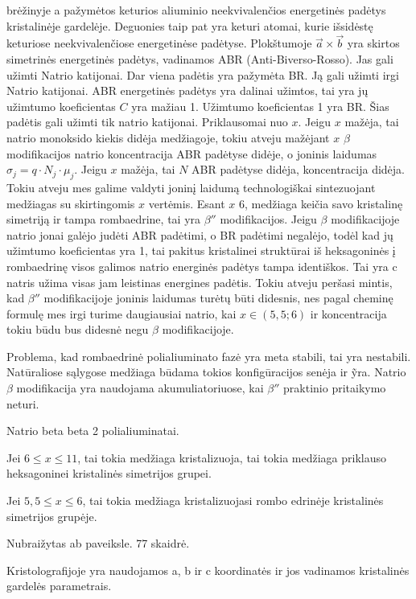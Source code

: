  brėžinyje a pažymėtos keturios aliuminio neekvivalenčios
energetinės padėtys kristalinėje gardelėje. Deguonies taip pat yra
keturi atomai, kurie išsidėstę keturiose neekvivalenčiose energetinėse
padėtyse. Plokštumoje $\vec{a} \times \vec{b}$ yra skirtos simetrinės
energetinės padėtys, vadinamos ABR (Anti-Biverso-Rosso). Jas gali
užimti Natrio katijonai. Dar viena padėtis yra pažymėta BR. Ją gali
užimti irgi Natrio katijonai. ABR energetinės padėtys yra dalinai
užimtos, tai yra jų užimtumo koeficientas $C$ yra mažiau 1. Užimtumo
koeficientas 1 yra BR. Šias padėtis gali užimti tik natrio katijonai.
Priklausomai nuo $x$. Jeigu $x$ mažėja, tai natrio monoksido
kiekis didėja medžiagoje, tokiu atveju mažėjant $x$ $\beta$
modifikacijos natrio koncentracija ABR padėtyse didėje, o joninis
laidumas $\sigma_{j} = q\cdot N_{j} \cdot \mu_{j}$. Jeigu $x$ mažėja,
tai  $N$ ABR padėtyse didėja, koncentracija didėja. Tokiu atveju mes
galime valdyti joninį laidumą technologiškai sintezuojant medžiagas
su skirtingomis $x$ vertėmis. Esant $x$ 6, medžiaga keičia savo
kristalinę simetriją ir tampa rombaedrine, tai yra $\beta''$
modifikacijos. Jeigu $\beta$ modifikacijoje natrio jonai galėjo
judėti ABR padėtimi, o BR padėtimi negalėjo, todėl kad jų užimtumo
koeficientas yra 1, tai pakitus kristalinei struktūrai iš heksagoninės
į rombaedrinę visos galimos natrio energinės padėtys tampa identiškos.
Tai yra  c natris užima visas jam leistinas energines
padėtis. Tokiu atveju peršasi mintis, kad $\beta''$ modifikacijoje
joninis laidumas turėtų būti didesnis, nes pagal cheminę formulę mes
irgi turime daugiausiai natrio, kai $x \in (5,5; 6)$ ir koncentracija
tokiu būdu bus didesnė negu $\beta$ modifikacijoje.

Problema, kad rombaedrinė polialiuminato fazė yra meta stabili, tai
yra nestabili. Natūraliose sąlygose medžiaga būdama tokios
konfigūracijos senėja ir ỹra. Natrio $\beta$ modifikacija yra
naudojama akumuliatoriuose, kai $\beta''$ praktinio pritaikymo neturi.

Natrio beta beta 2 polialiuminatai.

Jei $6 \leq x \leq 11$, tai tokia medžiaga kristalizuoja, tai tokia
medžiaga priklauso heksagoninei kristalinės simetrijos grupei.

Jei $5,5 \leq x \leq 6$, tai tokia medžiaga kristalizuojasi rombo
edrinėje kristalinės simetrijos grupėje.

Nubraižytas ab paveiksle. 77 skaidrė.

Kristolografijoje yra naudojamos a, b ir c koordinatės ir jos vadinamos
kristalinės gardelės parametrais.

